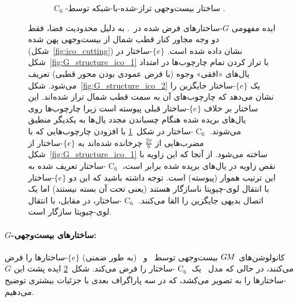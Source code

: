 \begin{figure}
\begin{subfigure}[b]{0.31\textwidth}
        \vspace*{-6pt}
        \captionsetup{width=.9\textwidth}
        \caption{\small
            $\operatorname{C}_6$-ساختار بیست‌وجهی تراز-شده-با-شبکه توسط \citet{gaugeIco2019}.
        }
        \label{fig:G_structure_ico_3}
    \end{subfigure}
    \caption{\small
        ایده مفهومی $G$-ساختارهای فرض شده در~\cite{liu2018icoAltAz,zhang2019orientation,gaugeIco2019}.
        به دلیل محدودیت فضا، فقط دو وجه مجاور کنار قطب شمال از بیست‌وجهی پهن شده (شکل~\ref{fig:ico_cutting}) نشان داده شده است.
        $\{e\}$-ساختار در شکل~\ref{fig:G_structure_ico_1} با تراز کردن تمام چارچوب‌ها در امتداد یال‌های «افقی» وجوه (با فرض عمودی بودن محور قطبی) تعریف می‌شود.
        شکل~\ref{fig:G_structure_ico_2} یک $\{e\}$-ساختار جایگزین را نشان می‌دهد که چارچوب‌های آن به سمت قطب شمال تراز شده‌اند.
        این ساختار بر خلاف $\{e\}$-ساختار قبلی پیوسته است زیرا چارچوب‌ها روی یال‌های بریده شده هنگام چسباندن مجدد یال‌ها به یکدیگر منطبق می‌شوند.
        $\operatorname{C}_6$-ساختار در شکل~\ref{fig:G_structure_ico_3} با افزودن چارچوب‌هایی که با مضرب‌هایی از $\frac{2\pi}{6}$ چرخانده شده‌اند به $\{e\}$-ساختار از شکل~\ref{fig:G_structure_ico_1} ساخته می‌شود.
        از آنجا که این زاویه با نقص زاویه در یال‌های بریده شده برابر است، $\operatorname{C}_6$-ساختار تعریف شده به این ترتیب هموار (پیوسته) است.
        توجه داشته باشید که این دو $\{e\}$-ساختار با انتقال لوی-چیویتا ناسازگار هستند (یعنی تحت آن بسته نیستند) اما یک اتصال بدیهی جایگزین را القا می‌کنند.
        $\operatorname{C}_6$-ساختار، در مقابل، با انتقال لوی-چیویتا سازگار است.
    }
    \label{fig:G_structures_ico}
\end{figure}


\paragraph{$G$-ساختارهای بیست‌وجهی:}
کانولوشن‌های $G\mkern-1.4muM$ بیست‌وجهی توسط~\citet{liu2018icoAltAz} و~\citet{zhang2019orientation} (به طور ضمنی) $\{e\}$-ساختارها را فرض می‌کنند، در حالی که مدل~\citet{gaugeIco2019} یک $\operatorname{C}_6$-ساختار را فرض می‌کند.
شکل~\ref{fig:G_structures_ico} ایده پشت این $G$-ساختارها را به تصویر می‌کشد، که در سه پاراگراف بعدی با جزئیات بیشتری توضیح می‌دهیم.


